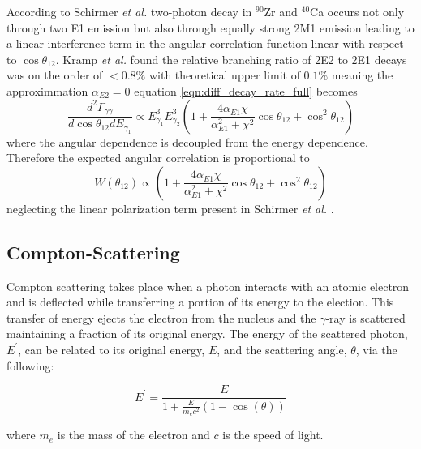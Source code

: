 \documentclass[cnatzke_thesis_proposal.tex]{subfiles}
\begin{document}
According to Schirmer \textit{et al.} two-photon decay in $^{90}$Zr and $^{40}$Ca occurs not only through two E1 emission but also through equally strong 2M1 emission leading to a linear interference term in the angular correlation function linear with respect to $\cos\theta_{12}$. 
Kramp \textit{et al.} found the relative branching ratio of 2E2 to 2E1 decays was on the order of $<0.8\%$ with theoretical upper limit of $0.1\%$ meaning the approximmation $\alpha_{E2} = 0$ equation \ref{eqn:diff_decay_rate_full} becomes 
\begin{equation}
    \frac{d^2\Gamma_{\gamma\gamma}}{d \cos\theta_{12} dE_{\gamma_1}} \propto E_{\gamma_1}^3 E_{\gamma_2}^3 \left( 1 + \frac{4 \alpha_{E1} \chi}{\alpha_{E1}^2 + \chi^2} \cos\theta_{12} +  \cos^2\theta_{12} \right)
\end{equation}
where the angular dependence is decoupled from the energy dependence. Therefore the expected angular correlation is proportional to
\begin{equation} \label{eqn:angular-distribution}
   W(\theta_{12}) \propto \left( 1 + \frac{4 \alpha_{E1} \chi}{\alpha_{E1}^2 + \chi^2} \cos\theta_{12} +  \cos^2\theta_{12} \right)
\end{equation}
neglecting the linear polarization term present in Schirmer \textit{et al.} \cite{schirmer_double_1984}.

\subsection{Compton-Scattering}
\label{sec:compton_scatter}

Compton scattering takes place when a photon interacts with an atomic electron and is deflected while transferring a portion of its energy to the election. 
This transfer of energy ejects the electron from the nucleus and the $\gamma$-ray is scattered maintaining a fraction of its original energy. 
The energy of the scattered photon, $E^{'}$, can be related to its original energy, $E$, and the scattering angle, $\theta$, via the following:

\begin{equation}
    E^{'} = \frac{E}{1 + \frac{E}{m_e c^2}(1 - \cos(\theta))}
\end{equation}

where $m_e$ is the mass of the electron and $c$ is the speed of light. 




\end{document}
